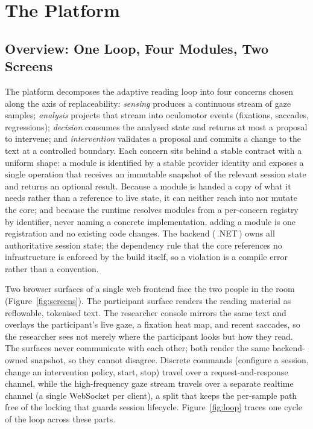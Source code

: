 \section{The Platform}
\label{sec:platform}

\subsection{Overview: One Loop, Four Modules, Two Screens}
\label{sec:platform-overview}

The platform decomposes the adaptive reading loop into four concerns chosen along the axis of replaceability: \emph{sensing} produces a continuous stream of gaze samples; \emph{analysis} projects that stream into oculomotor events (fixations, saccades, regressions); \emph{decision} consumes the analysed state and returns at most a proposal to intervene; and \emph{intervention} validates a proposal and commits a change to the text at a controlled boundary.
Each concern sits behind a stable contract with a uniform shape: a module is identified by a stable provider identity and exposes a single operation that receives an immutable snapshot of the relevant session state and returns an optional result.
Because a module is handed a copy of what it needs rather than a reference to live state, it can neither reach into nor mutate the core; and because the runtime resolves modules from a per-concern registry by identifier, never naming a concrete implementation, adding a module is one registration and no existing code changes.
The backend (\,.NET\,) owns all authoritative session state; the dependency rule that the core references no infrastructure is enforced by the build itself, so a violation is a compile error rather than a convention.

Two browser surfaces of a single web frontend face the two people in the room (Figure~\ref{fig:screens}).
The participant surface renders the reading material as reflowable, tokenised text.
The researcher console mirrors the same text and overlays the participant's live gaze, a fixation heat map, and recent saccades, so the researcher sees not merely where the participant looks but how they read.
The surfaces never communicate with each other; both render the same backend-owned snapshot, so they cannot disagree.
Discrete commands (configure a session, change an intervention policy, start, stop) travel over a request-and-response channel, while the high-frequency gaze stream travels over a separate realtime channel (a single WebSocket per client), a split that keeps the per-sample path free of the locking that guards session lifecycle.
Figure~\ref{fig:loop} traces one cycle of the loop across these parts.

